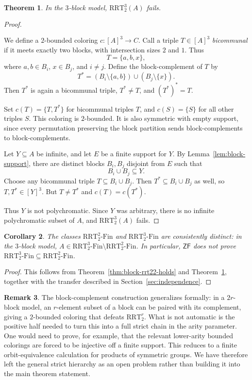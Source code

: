 \documentclass[10pt,a4paper]{amsart}
\newtheorem{theorem}{Theorem}[section]
\newtheorem{corollary}[theorem]{Corollary}
\theoremstyle{definition}
\newtheorem{remark}[theorem]{Remark}
\newcommand{\ZF}{\mathsf{ZF}}
\newcommand{\RRT}{\mathrm{RRT}}
\newcommand{\RRTFin}[2]{\RRT^{#1}_{#2}\text{-}\mathrm{Fin}}
\begin{document}
\begin{theorem}\label{thm:block-rrt32-fails}
In the \(3\)-block model, \(\RRT^3_2(A)\) fails.
\end{theorem}

\begin{proof}
\begin{samepage}
We define a \(2\)-bounded coloring \(c:[A]^3\to C\).  Call a triple \(T\in[A]^3\) \emph{bicommunal} if it meets exactly two blocks, with intersection sizes \(2\) and \(1\).  Thus
\[
    T=\{a,b,x\},
\]
where \(a,b\in B_i\), \(x\in B_j\), and \(i\neq j\).  Define the block-complement of \(T\) by
\[
    T^*=(B_i\setminus\{a,b\})\cup (B_j\setminus\{x\}).
\]
Then \(T^*\) is again a bicommunal triple, \(T^*\neq T\), and \((T^*)^*=T\).
\end{samepage}

Set \(c(T)=\{T,T^*\}\) for bicommunal triples \(T\), and \(c(S)=\{S\}\) for all other triples \(S\).  This coloring is \(2\)-bounded.  It is also symmetric with empty support, since every permutation preserving the block partition sends block-complements to block-complements.

Let \(Y\subseteq A\) be infinite, and let \(E\) be a finite support for \(Y\).  By Lemma~\ref{lem:block-support}, there are distinct blocks \(B_i,B_j\) disjoint from \(E\) such that
\[
    B_i\cup B_j\subseteq Y.
\]
Choose any bicommunal triple \(T\subseteq B_i\cup B_j\).  Then \(T^*\subseteq B_i\cup B_j\) as well, so \(T,T^*\in[Y]^3\).  But \(T\neq T^*\) and \(c(T)=c(T^*)\).

Thus \(Y\) is not polychromatic.  Since \(Y\) was arbitrary, there is no infinite polychromatic subset of \(A\), and \(\RRT^3_2(A)\) fails.
\end{proof}

\begin{corollary}
The classes \(\RRTFin{2}{2}\) and \(\RRTFin{3}{2}\) are consistently distinct: in the \(3\)-block model, \(A\in \RRTFin{3}{2}\setminus \RRTFin{2}{2}\).  In particular, \(\ZF\) does not prove \(\RRTFin{3}{2}\subseteq \RRTFin{2}{2}\).
\end{corollary}

\begin{proof}
This follows from Theorem~\ref{thm:block-rrt22-holds} and Theorem~\ref{thm:block-rrt32-fails}, together with the transfer described in Section~\ref{sec:independence}.
\end{proof}

\begin{remark}
The block-complement construction generalizes formally: in a \(2r\)-block model, an \(r\)-element subset of a block can be paired with its complement, giving a \(2\)-bounded coloring that defeats \(\RRT^r_2\).  What is not automatic is the positive half needed to turn this into a full strict chain in the arity parameter.  One would need to prove, for example, that the relevant lower-arity bounded colorings are forced to be injective off a finite support.  This reduces to a finite orbit-equivalence calculation for products of symmetric groups.  We have therefore left the general strict hierarchy as an open problem rather than building it into the main theorem statement.
\end{remark}
\end{document}
